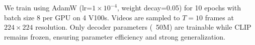 We train using AdamW (lr=$1 \times 10^{-4}$, weight decay=0.05) for 10 epochs with batch size 8 per GPU on 4 V100s. Videos are sampled to $T=10$ frames at $224 \times 224$ resolution. Only decoder parameters (~50M) are trainable while CLIP remains frozen, ensuring parameter efficiency and strong generalization.

